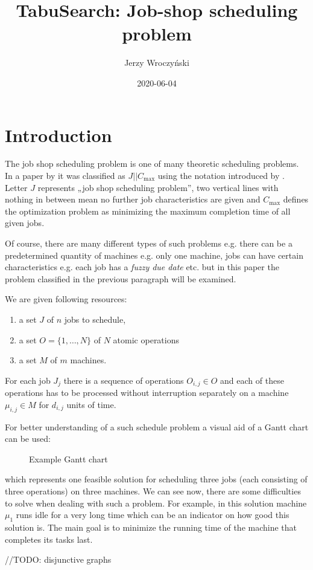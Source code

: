 \documentclass[14pt]{article}
\title{TabuSearch: Job-shop scheduling problem}
\author{Jerzy Wroczyński}
\date{2020-06-04}
\begin{document}
\maketitle

\section{Introduction}

The job shop scheduling problem is one of many theoretic scheduling problems. In a paper by \citet{amico-trubian} it was classified as $J || C_{\max}$ using the notation introduced by \citet{graham}. Letter $J$ represents „job shop scheduling problem”, two vertical lines with nothing in between mean no further job characteristics are given and $C_{\max}$ defines the optimization problem as minimizing the maximum completion time of all given jobs.

Of course, there are many different types of such problems e.g. there can be a predetermined quantity of machines e.g. only one machine, jobs can have certain characteristics e.g. each job has a \textit{fuzzy due date} etc. but in this paper the problem classified in the previous paragraph will be examined.

\hspace{2pt}

We are given following resources:
\begin{enumerate}
  \item a set $J$ of $n$ jobs to schedule,
  \item a set $O = \{1,\dots,N\}$ of $N$ atomic operations
  \item a set $M$ of $m$ machines.
\end{enumerate}

For each job $J_j$ there is a sequence of operations $O_{i,j} \in O$ and each of these operations has to be processed without interruption separately on a machine $\mu_{i,j} \in M$ for $d_{i,j}$ units of time.

For better understanding of a such schedule problem a visual aid of a Gantt chart can be used:
\begin{figure}[H]
  \centering
  \def\svgwidth{\columnwidth}
  
  \caption{Example Gantt chart}
  \label{example-gantt}
\end{figure}

which represents one feasible solution for scheduling three jobs (each consisting of three operations) on three machines. We can see now, there are some difficulties to solve when dealing with such a problem. For example, in this solution machine $\mu_1$ runs idle for a very long time which can be an indicator on how good this solution is. The main goal is to minimize the running time of the machine that completes its tasks last.

//TODO: disjunctive graphs



\end{document}
